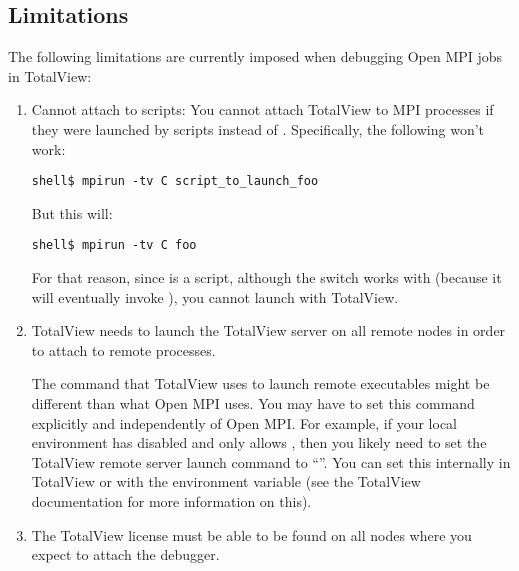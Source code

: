 
\subsection{Limitations}

The following limitations are currently imposed when debugging Open MPI
jobs in TotalView:

\begin{enumerate}
\item Cannot attach to scripts: You cannot attach TotalView to MPI
  processes if they were launched by scripts instead of .
  Specifically, the following won't work:
                
  \lstset{style=lam-cmdline}
  \begin{lstlisting}
shell$ mpirun -tv C script_to_launch_foo
  \end{lstlisting}

  But this will:

  \lstset{style=lam-cmdline}
  \begin{lstlisting}
shell$ mpirun -tv C foo
  \end{lstlisting}
  
  For that reason, since  is a script, although the
   switch works with  (because it will
  eventually invoke ), you cannot launch 
  with TotalView.
  
\item TotalView needs to launch the TotalView server on all remote
  nodes in order to attach to remote processes.  
  
  The command that TotalView uses to launch remote executables might
  be different than what Open MPI uses.  You may have to set this
  command explicitly and independently of Open MPI.
%
  For example, if your local environment has  disabled and
  only allows , then you likely need to set the TotalView
  remote server launch command to ``''.  You can set this
  internally in TotalView or with the 
  environment variable (see the TotalView documentation for more
  information on this).
  
\item The TotalView license must be able to be found on all nodes
  where you expect to attach the debugger.  
  

\end{enumerate}
